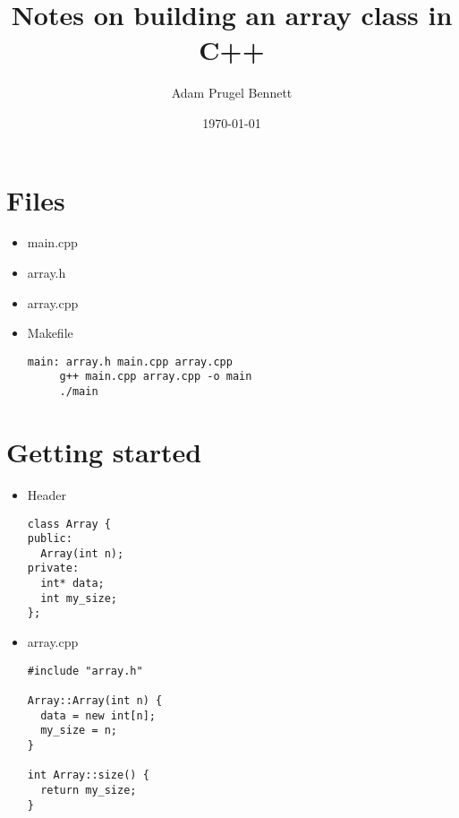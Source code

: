 \documentclass[11pt]{article}
\author{Adam Prugel Bennett}
\date{\today}
\title{Notes on building an array class in C++}
\begin{document}
\maketitle

\section{Files}
\label{sec:org409e323}
\begin{itemize}
\item main.cpp
\item array.h
\item array.cpp
\item Makefile
\begin{verbatim}
main: array.h main.cpp array.cpp
     g++ main.cpp array.cpp -o main
     ./main
\end{verbatim}
\end{itemize}

\section{Getting started}
\label{sec:org4d15ff9}
\begin{itemize}
\item Header
\begin{verbatim}
class Array {
public:
  Array(int n);
private:
  int* data;
  int my_size;
};
\end{verbatim}
\item array.cpp
\begin{verbatim}
#include "array.h"

Array::Array(int n) {
  data = new int[n];
  my_size = n;
}

int Array::size() {
  return my_size;
}
\end{verbatim}
\end{itemize}
\end{document}
